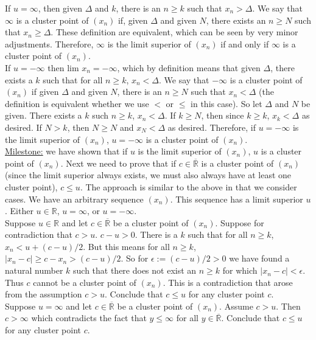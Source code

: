 \documentclass[a4paper]{article}
\begin{document}
If $u = \infty$, then given $\Delta$ and $k$, there is an $n \geq k$ such that $x_n > \Delta$. We say that $\infty$ is a cluster point of $(x_n)$ if, given $\Delta$ and given $N$, there exists an $n \geq N$ such that $x_n \geq \Delta$. These definition are equivalent, which can be seen by very minor adjustments. Therefore, $\infty$ is the limit superior of $(x_n)$ if and only if $\infty$ is a cluster point of $(x_n)$. \\

If $u = -\infty$ then lim $x_n = -\infty$, which by definition means that given $\Delta$, there exists a $k$ such that for all $n \geq k$, $x_n < \Delta$. We say that $-\infty$ is a cluster point of $(x_n)$ if given $\Delta$ and given $N$, there is an $n \geq N$ such that $x_n < \Delta$ (the definition is equivalent whether we use $<$ or $\leq$ in this case). So let $\Delta$ and $N$ be given. There exists a $k$ such $n \geq k$, $x_n < \Delta$. If $k \geq N$, then since $k\geq k$, $x_k < \Delta$ as desired. If $N>k$, then $N\geq N$ and $x_N < \Delta$ as desired. Therefore, if $u = -\infty$ is the limit superior of $(x_n)$, $u = -\infty$ is a cluster point of $(x_n)$. \\

\underline{Milestone:} we have shown that if $u$ is the limit superior of $(x_n)$, $u$ is a cluster point of $(x_n)$. Next we need to prove that if $c \in \overline{\mathbb{R}}$ is a cluster point of $(x_n)$ (since the limit superior always exists, we must also always have at least one cluster point), $c\leq u$. The approach is similar to the above in that we consider cases. We have an arbitrary sequence $(x_n)$. This sequence has a limit superior $u$. Either $u \in \mathbb{R}$, $u = \infty$, or $u = -\infty$.\\

Suppose $u \in \mathbb{R}$ and let $c \in \overline{\mathbb{R}}$ be a cluster point of $(x_n)$. Suppose for contradiction that $c>u$. $c-u>0$. There is a $k$ such that for all $n\geq k$, $x_n < u + (c-u)/2$. But this means for all $n\geq k$, $|x_n - c| \geq c - x_n > (c-u)/2$. So for $\epsilon := (c-u)/2 >0$ we have found a natural number $k$ such that there does not exist an $n\geq k$ for which $|x_n-c| < \epsilon$. Thus $c$ cannot be a cluster point of $(x_n)$. This is a contradiction that arose from the assumption $c>u$. Conclude that $c \leq u$ for any cluster point $c$. \\

Suppose $u =\infty$ and let $c \in \overline{\mathbb{R}}$ be a cluster point of $(x_n)$. Assume $c>u$. Then $c>\infty$ which contradicts the fact that $y\leq \infty$ for all $y \in \overline{\mathbb{R}}$. Conclude that $c\leq u$ for any cluster point $c$. \\
\end{document}
